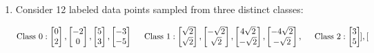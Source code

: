 \documentclass[10pt]{article}
\begin{document}
\begin{enumerate}[1.]
    \item  Consider 12 labeled data points sampled from three distinct classes:
          \begin{scriptsize}
              \begin{equation*}
                  \text{Class 0}:
                  \begin{bmatrix}
                      0 \\
                      2
                  \end{bmatrix},\begin{bmatrix}
                      -2 \\
                      0
                  \end{bmatrix},
                  \begin{bmatrix}
                      5 \\
                      3
                  \end{bmatrix},
                  \begin{bmatrix}
                      -3 \\
                      -5
                  \end{bmatrix}
                  \hspace{0.5cm}\text{Class 1}:
                  \begin{bmatrix}
                      \sqrt{2} \\
                      \sqrt{2}
                  \end{bmatrix},\begin{bmatrix}
                      -\sqrt{2} \\
                      \sqrt{2}
                  \end{bmatrix},
                  \begin{bmatrix}
                      4\sqrt{2} \\
                      -\sqrt{2}
                  \end{bmatrix},
                  \begin{bmatrix}
                      -4\sqrt{2} \\
                      -\sqrt{2}
                  \end{bmatrix}, \hspace{0.5cm}\text{Class 2}:
                  \begin{bmatrix}
                      3 \\
                      5
                  \end{bmatrix},\begin{bmatrix}

\end{bmatrix}
\end{equation*}
\end{scriptsize}
\end{enumerate}
\end{document}
